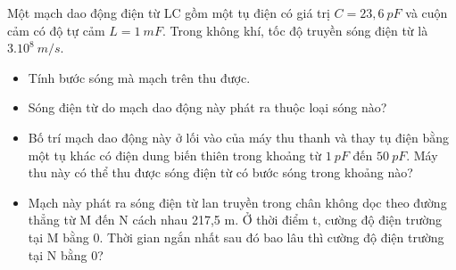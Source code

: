 \begin{vidu}
Một mạch dao động điện từ LC gồm một tụ điện có giá trị $C=23,6\ pF$ và cuộn cảm có độ tự cảm $L=1\ mF$. Trong không khí, tốc độ truyền sóng điện từ là $3.10^8\ m/s$.
\begin{itemize}
\item[a)] Tính bước sóng mà mạch trên thu được.
\item[b)] Sóng điện từ do mạch dao động này phát ra thuộc loại sóng nào?
\item[c)] Bố trí mạch dao động này ở lối vào của máy thu thanh và thay tụ điện bằng một tụ khác có điện dung biến thiên trong khoảng từ $1\ pF$ đến $50\ pF$. Máy thu này có thể thu được sóng điện từ có bước sóng trong khoảng nào?
\item[d)] Mạch này phát ra sóng điện từ lan truyền trong chân không dọc theo đường thẳng từ M đến N cách nhau 217,5 m. Ở thời điểm t, cường độ điện trường tại M bằng 0. Thời gian ngắn nhất sau đó bao lâu thì cường độ điện trường tại N bằng 0?
\end{itemize}	
\end{vidu}

